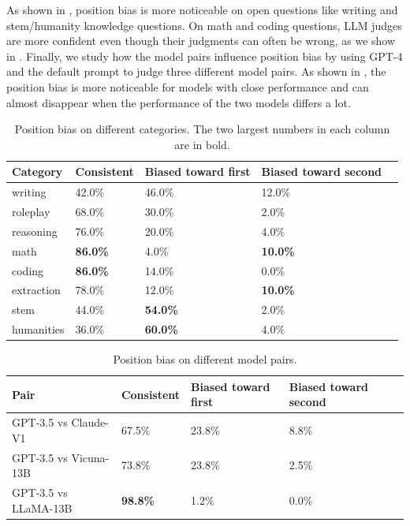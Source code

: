 As shown in , position bias is more noticeable on open questions like writing and stem/humanity knowledge questions.
On math and coding questions, LLM judges are more confident even though their judgments can often be wrong, as we show in . Finally, we study how the model pairs influence position bias by using GPT-4 and the default prompt to judge three different model pairs. As shown in , the position bias is more noticeable for models with close performance and can almost disappear when the performance of the two models differs a lot.

\begin{table}[h]
\centering
\footnotesize
\caption{Position bias on different categories. The two largest numbers in each column are in bold.}
\label{tab:position_bias_category}
\begin{tabular}{lllll}
\toprule
Category & Consistent & Biased toward first & Biased toward second \\
\midrule
writing & 42.0\% & 46.0\% & 12.0\% \\
roleplay & 68.0\% & 30.0\% & 2.0\% \\
reasoning & 76.0\% & 20.0\% & 4.0\% \\
math & \textbf{86.0\%} & 4.0\% & \textbf{10.0\%} \\
coding & \textbf{86.0\%} & 14.0\% & 0.0\% \\
extraction & 78.0\% & 12.0\% & \textbf{10.0\%} \\
stem & 44.0\% & \textbf{54.0\%} & 2.0\% \\
humanities & 36.0\% & \textbf{60.0\%} & 4.0\% \\
\bottomrule
\end{tabular}
\end{table}

\begin{table}[h]
\centering
\footnotesize
\caption{Position bias on different model pairs.}
\label{tab:position_bias_pairs}
\begin{tabular}{lllll}
\toprule
Pair & Consistent & Biased toward first & Biased toward second \\
\midrule
GPT-3.5 vs Claude-V1  & 67.5\% & 23.8\% & 8.8\% \\
GPT-3.5 vs Vicuna-13B & 73.8\% & 23.8\% & 2.5\% \\
GPT-3.5 vs LLaMA-13B  & \textbf{98.8\%} & 1.2\% & 0.0\% \\
\bottomrule
\end{tabular}
\end{table}

